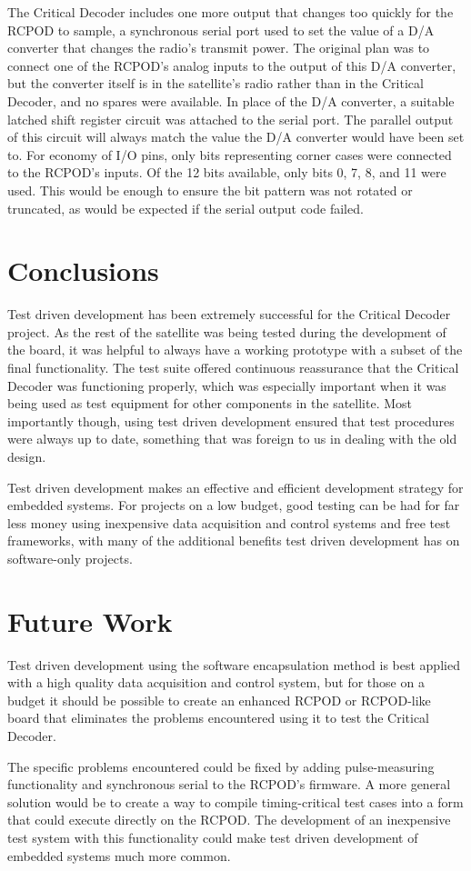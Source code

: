\documentclass[letterpaper,twocolumn]{article}
\begin{document}
The Critical Decoder includes one more output that changes too quickly for the RCPOD to sample, a synchronous
serial port used to set the value of a D/A converter that changes the radio's transmit power. The original plan
was to connect one of the RCPOD's analog inputs to the output of this D/A converter, but the converter itself
is in the satellite's radio rather than in the Critical Decoder, and no spares were available. In place of the
D/A converter, a suitable latched shift register circuit was attached to the serial port. The parallel output
of this circuit will always match the value the D/A converter would have been set to. For economy of I/O pins,
only bits representing corner cases were connected to the RCPOD's inputs. Of the 12 bits available, only bits
0, 7, 8, and 11 were used. This would be enough to ensure the bit pattern was not rotated or truncated, as would
be expected if the serial output code failed.

\section{Conclusions}

Test driven development has been extremely successful for the Critical Decoder project. As the rest of the
satellite was being tested during the development of the board, it was helpful to always have a working
prototype with a subset of the final functionality. The test suite offered continuous reassurance that the
Critical Decoder was functioning properly, which was especially important when it was being used as
test equipment for other components in the satellite. Most importantly though, using test driven development
ensured that test procedures were always up to date, something that was foreign to us in dealing with the
old design.

Test driven development makes an effective and efficient development strategy for embedded systems. For
projects on a low budget, good testing can be had for far less money using inexpensive data acquisition
and control systems and free test frameworks, with many of the additional benefits test driven development
has on software-only projects.

\section{Future Work}

Test driven development using the software encapsulation method is best applied with a high quality
data acquisition and control system, but for those on a budget it should be possible to create an enhanced
RCPOD or RCPOD-like board that eliminates the problems encountered using it to test the Critical Decoder.

The specific problems encountered could be fixed by adding pulse-measuring functionality and synchronous
serial to the RCPOD's firmware. A more general solution would be to create a way to compile timing-critical
test cases into a form that could execute directly on the RCPOD. The development of an inexpensive test
system with this functionality could make test driven development of embedded systems much more common.
\end{document}
